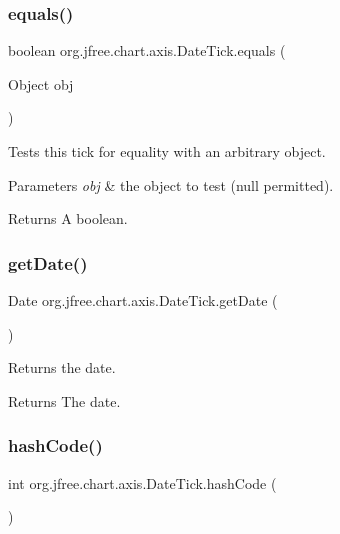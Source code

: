 \subsubsection{\texorpdfstring{equals()}{equals()}}
{\footnotesize\ttfamily boolean org.\+jfree.\+chart.\+axis.\+Date\+Tick.\+equals (\begin{DoxyParamCaption}\item[{Object}]{obj }\end{DoxyParamCaption})}

Tests this tick for equality with an arbitrary object.


\begin{DoxyParams}{Parameters}
{\em obj} & the object to test ({\ttfamily null} permitted).\\
\hline
\end{DoxyParams}
\begin{DoxyReturn}{Returns}
A boolean. 
\end{DoxyReturn}
\mbox{\label{classorg_1_1jfree_1_1chart_1_1axis_1_1_date_tick_a0939d28d4cec0513d75057550b39a0e7}} 
\subsubsection{\texorpdfstring{get\+Date()}{getDate()}}
{\footnotesize\ttfamily Date org.\+jfree.\+chart.\+axis.\+Date\+Tick.\+get\+Date (\begin{DoxyParamCaption}{ }\end{DoxyParamCaption})}

Returns the date.

\begin{DoxyReturn}{Returns}
The date. 
\end{DoxyReturn}
\mbox{\label{classorg_1_1jfree_1_1chart_1_1axis_1_1_date_tick_a5fce3ddb347cba8347e5017a99c11808}} 
\subsubsection{\texorpdfstring{hash\+Code()}{hashCode()}}
{\footnotesize\ttfamily int org.\+jfree.\+chart.\+axis.\+Date\+Tick.\+hash\+Code (\begin{DoxyParamCaption}{ }\end{DoxyParamCaption})}

